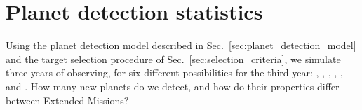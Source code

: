 \section{Planet detection statistics}  
\label{sec:newly_detected_planet_metrics}

Using the planet detection model described in Sec.~\ref{sec:planet_detection_model} and the target selection procedure of Sec.~\ref{sec:selection_criteria}, we simulate three years of \tess observing, for six different possibilities for the third year:
\nhemi, \npole, \shemiAvoid, \elong, \eshort, and \hemis.
How many new planets do we detect, and how do their properties differ between Extended Missions?








